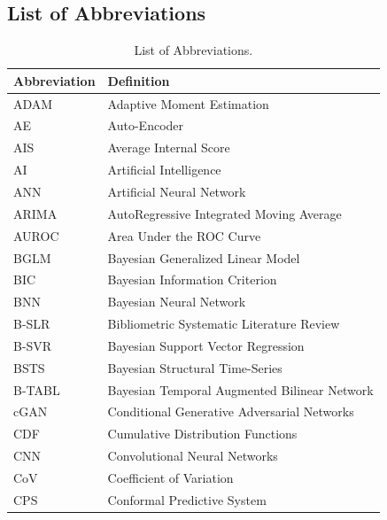 \subsection{List of Abbreviations}
\label{appendix:list_of_abbrevations}

\renewcommand{\thetable}{A\arabic{table}} %
\setcounter{table}{0} %

\begin{table}[H]
    \centering
    \caption[List of Abbreviations]{List of Abbreviations.}
    \label{table:abbreviations}
    \small
    \begin{subtable}[t]{0.49\textwidth}
        \centering
        \begin{tabular}{lp{}}
        \toprule
        \textbf{Abbreviation} & \textbf{Definition} \\
        \midrule
        ADAM & Adaptive Moment Estimation \\
        AE & Auto-Encoder \\
        AIS & Average Internal Score \\
        AI & Artificial Intelligence \\
        ANN & Artificial Neural Network \\
        ARIMA & AutoRegressive Integrated Moving Average \\
        AUROC & Area Under the ROC Curve \\
        BGLM & Bayesian Generalized Linear Model \\
        BIC & Bayesian Information Criterion \\
        BNN & Bayesian Neural Network \\
        B-SLR & Bibliometric Systematic Literature Review \\
        B-SVR & Bayesian Support Vector Regression \\
        BSTS & Bayesian Structural Time-Series \\
        B-TABL & Bayesian Temporal Augmented Bilinear Network \\
        cGAN & Conditional Generative Adversarial Networks \\
        CDF & Cumulative Distribution Functions \\
        CNN & Convolutional Neural Networks \\
        CoV & Coefficient of Variation \\
        CPS & Conformal Predictive System \\

\end{tabular}
\end{subtable}
\end{table}
